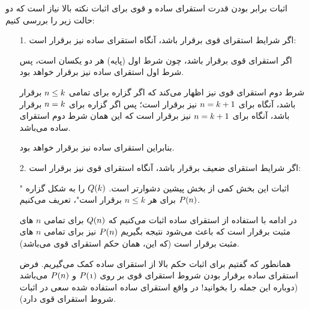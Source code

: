 
    \begin{EXTRA}{اثبات برابر بودن قدرت استقرای ساده و قوی}
        برای اثبات نکته بالا نیاز است که دو حالت زیر را بررسی کنیم:

        \begin{enumerate}
            \item[1.] اگر شرایط استقرای قوی برقرار باشد، آنگاه استقرای ساده نیز برقرار است:
            
                اگر استقرای قوی برقرار باشد، چون شرط اول
                (پایه)
                هر دو یکسان است، پس شرط اول استقرای ساده نیز برقرار خواهد بود.
                
                شرط دوم استقرای قوی نیز اظهار می‌کند که
                اگر گزاره برای تمامی
                $\mathnormal{n} \leq k$
                برقرار باشد، آنگاه برای
                $\mathnormal{n} = k + 1$
                نیز برقرار است؛ پس اگر 
                گزاره برای
                $\mathnormal{n} = k$
                برقرار باشد، آنگاه برای
                $\mathnormal{n} = k + 1$
                نیز برقرار است که این همان شرط دوم استقرای ساده می‌باشد.
                    
                بنابراین استقرای ساده نیز برقرار خواهد بود.
                
            \item[2.] اگر شرایط استقرای ضعیف برقرار باشد، آنگاه استقرای قوی نیز برقرار است:
        
                اثبات این بخش کمی از بخش پیشین دشوارتر است.
                $\mathnormal{Q(k)}$
                را به شکل گزاره
                "$\mathnormal{P(n)}$
                برای هر
                $n \leq k$
                برقرار است"،
                تعریف می‌کنیم.

                در ادامه با استفاده از استقرای ساده اثبات می‌کنیم که
                $\mathnormal{Q(n)}$
                برای تمامی
                $n$ های
                مثبت برقرار است که باعث می‌شود نتیجه بگیریم
                $\mathnormal{P(n)}$
                نیز برای تمامی
                $n$ های
                مثبت برقرار است
                (که این، همان حکم استقرای قوی می‌باشد).

                همانطور که گفتیم برای اثبات حکم بالا از استقرای ساده کمک می‌گیریم. فرض استقرای ساده
                برقرار بودن شروط استقرای قوی بر روی
                $\mathnormal{P(1)}$
                و
                $\mathnormal{P(n)}$
                می‌باشد
                (دوباره این جمله را بخوانید! در واقع استقرای ساده استفاده شده سعی در اثبات شروط استقرای قوی دارد).


\end{enumerate}
\end{EXTRA}
